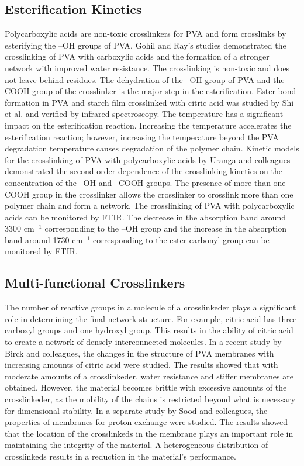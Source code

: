 \documentclass[12pt,a4paper]{report}
\begin{document}
\subsection{Esterification Kinetics}
Polycarboxylic acids are non-toxic crosslinkers for PVA and form crosslinks by esterifying the –OH groups of PVA. Gohil and Ray’s studies demonstrated the crosslinking of PVA with carboxylic acids and the formation of a stronger network with improved water resistance. The crosslinking is non-toxic and does not leave behind residues.\cite{48} The dehydration of the –OH group of PVA and the –COOH group of the crosslinker is the major step in the esterification. Ester bond formation in PVA and starch film crosslinked with citric acid was studied by Shi et al. and verified by infrared spectroscopy.\cite{49} The temperature has a significant impact on the esterification reaction. Increasing the temperature accelerates the esterification reaction; however, increasing the temperature beyond the PVA degradation temperature causes degradation of the polymer chain. Kinetic models for the crosslinking of PVA with polycarboxylic acids by Uranga and colleagues demonstrated the second-order dependence of the crosslinking kinetics on the concentration of the –OH and –COOH groups. The presence of more than one –COOH group in the crosslinker allows the crosslinker to crosslink more than one polymer chain and form a network.\cite{50} The crosslinking of PVA with polycarboxylic acids can be monitored by FTIR. The decrease in the absorption band around 3300 cm\(^{-1}\) corresponding to the –OH group and the increase in the absorption band around 1730 cm\(^{-1}\) corresponding to the ester carbonyl group can be monitored by FTIR.\cite{36,53}

\subsection{Multi-functional Crosslinkers}
The number of reactive groups in a molecule of a crosslinkeder plays a significant role in determining the final network structure. For example, citric acid has three carboxyl groups and one hydroxyl group. This results in the ability of citric acid to create a network of densely interconnected molecules. In a recent study by Birck and colleagues, the changes in the structure of PVA membranes with increasing amounts of citric acid were studied. The results showed that with moderate amounts of a crosslinkeder, water resistance and stiffer membranes are obtained. However, the material becomes brittle with excessive amounts of the crosslinkeder, as the mobility of the chains is restricted beyond what is necessary for dimensional stability. \cite{51}
In a separate study by Sood and colleagues, the properties of membranes for proton exchange were studied. The results showed that the location of the crosslinkeds in the membrane plays an important role in maintaining the integrity of the material. A heterogeneous distribution of crosslinkeds results in a reduction in the material’s performance.\cite{52}
\end{document}
